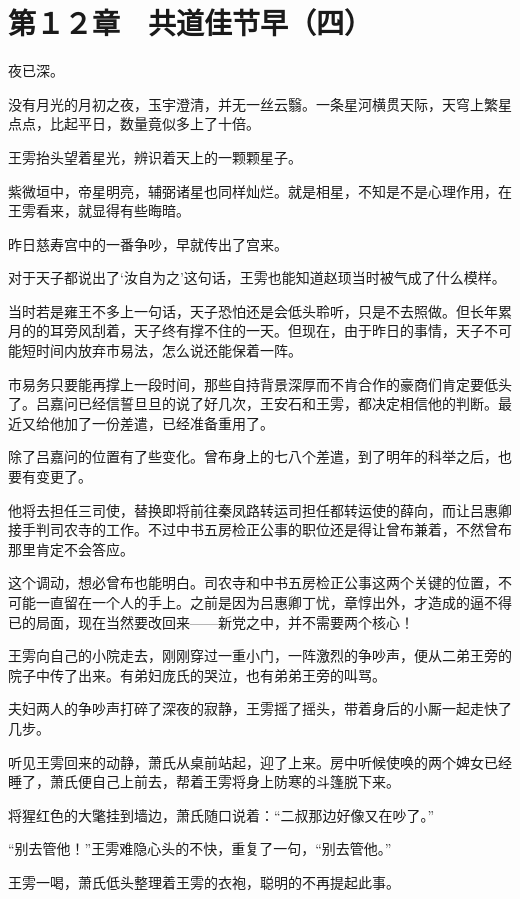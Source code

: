 \section{第１２章　共道佳节早（四）}

夜已深。

没有月光的月初之夜，玉宇澄清，并无一丝云翳。一条星河横贯天际，天穹上繁星点点，比起平日，数量竟似多上了十倍。

王雱抬头望着星光，辨识着天上的一颗颗星子。

紫微垣中，帝星明亮，辅弼诸星也同样灿烂。就是相星，不知是不是心理作用，在王雱看来，就显得有些晦暗。

昨日慈寿宫中的一番争吵，早就传出了宫来。

对于天子都说出了‘汝自为之’这句话，王雱也能知道赵顼当时被气成了什么模样。

当时若是雍王不多上一句话，天子恐怕还是会低头聆听，只是不去照做。但长年累月的的耳旁风刮着，天子终有撑不住的一天。但现在，由于昨日的事情，天子不可能短时间内放弃市易法，怎么说还能保着一阵。

市易务只要能再撑上一段时间，那些自持背景深厚而不肯合作的豪商们肯定要低头了。吕嘉问已经信誓旦旦的说了好几次，王安石和王雱，都决定相信他的判断。最近又给他加了一份差遣，已经准备重用了。

除了吕嘉问的位置有了些变化。曾布身上的七八个差遣，到了明年的科举之后，也要有变更了。

他将去担任三司使，替换即将前往秦凤路转运司担任都转运使的薛向，而让吕惠卿接手判司农寺的工作。不过中书五房检正公事的职位还是得让曾布兼着，不然曾布那里肯定不会答应。

这个调动，想必曾布也能明白。司农寺和中书五房检正公事这两个关键的位置，不可能一直留在一个人的手上。之前是因为吕惠卿丁忧，章惇出外，才造成的逼不得已的局面，现在当然要改回来——新党之中，并不需要两个核心！

王雱向自己的小院走去，刚刚穿过一重小门，一阵激烈的争吵声，便从二弟王旁的院子中传了出来。有弟妇庞氏的哭泣，也有弟弟王旁的叫骂。

夫妇两人的争吵声打碎了深夜的寂静，王雱摇了摇头，带着身后的小厮一起走快了几步。

听见王雱回来的动静，萧氏从桌前站起，迎了上来。房中听候使唤的两个婢女已经睡了，萧氏便自己上前去，帮着王雱将身上防寒的斗篷脱下来。

将猩红色的大氅挂到墙边，萧氏随口说着：“二叔那边好像又在吵了。”

“别去管他！”王雱难隐心头的不快，重复了一句，“别去管他。”

王雱一喝，萧氏低头整理着王雱的衣袍，聪明的不再提起此事。


